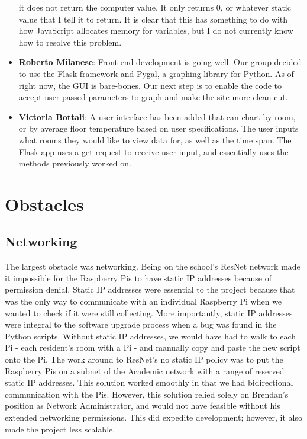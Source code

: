 \documentclass{article}
\begin{document}
\begin{itemize}
												   it does not return the computer value. It only returns 0, or whatever static value that I tell it to 
												   return. It is clear that this has something to do with how  JavaScript allocates memory for variables,
												   but I do not currently know how to resolve this problem.
					\item {\bfseries Roberto Milanese}: Front end development is going well. Our group decided to use the Flask framework and Pygal, a 																	graphing library for Python. As of right now, the GUI is bare-bones. Our next step is to enable the 																code to accept user passed parameters to graph and make the site more clean-cut. 					
					\item {\bfseries Victoria Bottali}: A user interface has been added that can chart by room, or by average floor temperature based on user 															specifications. The user inputs what rooms they would like to view data for, as well as the time span. 														The Flask app uses a get request to receive user input, and essentially uses the methods previously 															worked on.			
				\end{itemize}
			
	\newpage
	\section{Obstacles}\label{sec:obstacles}	
		\subsection{Networking}						
			The largest obstacle was networking. Being on the school's ResNet network made it impossible for the Raspberry Pis to have static IP addresses 
			because of permission denial. Static IP addresses were essential to the project because that was the only way to communicate with an individual 
			Raspberry Pi when we wanted to check if it were still collecting. More importantly, static IP addresses were integral to the software upgrade 
			process when a bug was found in the Python scripts. Without static IP addresses, we would have had to walk to each Pi - each resident's room with 
			a Pi - and manually copy and paste the new script onto the Pi. The work around to ResNet's no static IP policy was to put the Raspberry Pis on a 	
			subnet of the Academic network with a range of reserved static IP addresses. This solution worked smoothly in that we had bidirectional 
			communication with the Pis. However, this solution relied solely on Brendan's position as Network Administrator, and would not have feasible 
			without his extended networking permissions. This did expedite development; however, it also made the project less scalable.
			
\end{document}
